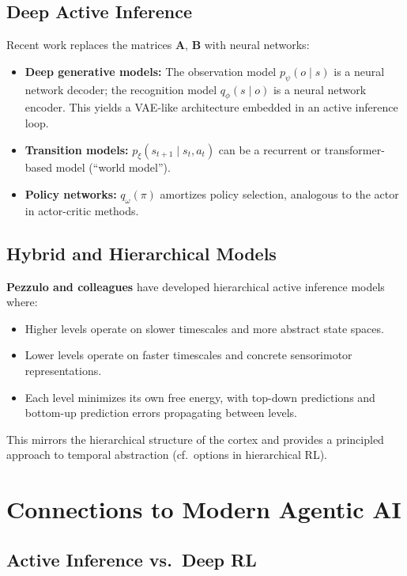 \documentclass[11pt,a4paper]{article}
\theoremstyle{definition}
\begin{document}
\subsection{Deep Active Inference}

Recent work replaces the matrices $\mathbf{A}$, $\mathbf{B}$ with neural
networks:
\begin{itemize}[leftmargin=2em]
  \item \textbf{Deep generative models:} The observation model $p_\psi(o \mid s)$
    is a neural network decoder; the recognition model $q_\phi(s \mid o)$ is a
    neural network encoder.  This yields a VAE-like architecture embedded in an
    active inference loop.
  \item \textbf{Transition models:} $p_\xi(s_{t+1} \mid s_t, a_t)$ can be a
    recurrent or transformer-based model (``world model'').
  \item \textbf{Policy networks:} $q_\omega(\pi)$ amortizes policy selection,
    analogous to the actor in actor-critic methods.
\end{itemize}

\subsection{Hybrid and Hierarchical Models}

\textbf{Pezzulo and colleagues} have developed hierarchical active inference
models where:
\begin{itemize}[leftmargin=2em]
  \item Higher levels operate on slower timescales and more abstract state spaces.
  \item Lower levels operate on faster timescales and concrete sensorimotor
    representations.
  \item Each level minimizes its own free energy, with top-down predictions and
    bottom-up prediction errors propagating between levels.
\end{itemize}
This mirrors the hierarchical structure of the cortex and provides a principled
approach to temporal abstraction (cf.\ options in hierarchical RL).


\section{Connections to Modern Agentic AI}
\label{sec:connections}

\subsection{Active Inference vs.\ Deep RL}
\end{document}
